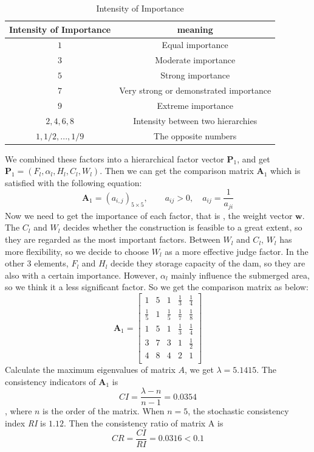 \documentclass{mcmthesis}
\begin{document}
\begin{table}[!ht]
\centering
  \begin{tabular}{cc}
  \hline
   Intensity of Importance & meaning  \\
  \hline
  $1$ & Equal importance \\
  $3$ & Moderate importance \\
  $5$ & Strong importance \\
  $7$ & Very strong or demonstrated importance \\
  $9$ & Extreme importance \\
  $2,4,6,8$ & Intensity between two hierarchies \\
  $1,1/2,...,1/9$ & The opposite numbers\\
  \hline
  \end{tabular}
  \caption{Intensity of Importance}
\end{table}

We combined these factors into a hierarchical factor vector $\textbf{P}_1$, and get $\textbf{P}_1 = (F_{l}, \alpha_{l}, H_{l}, C_{l}, W_{l})$. Then we can get the comparison matrix $\textbf{A}_1$ which is satisfied with the following equation:
\begin{equation}
\textbf{A}_1 = (a_{i,j})_{5\times5},\qquad a_{ij} > 0, \quad a_{ij} = \frac{1}{a_{ji}}
\end{equation}
Now we need to get the importance of each factor, that is , the weight vector $\textbf{w}$. The $C_{l}$ and $W_{l}$ decides whether the construction is feasible to a great extent, so they are regarded as the most important factors. Between $W_{l}$ and $C_{l}$, $W_{l}$ has more flexibility, so we decide to choose $W_{l}$ as a more effective judge factor. In the other 3 elements, $F_{l}$ and $H_{l}$ decide they storage capacity of the dam, so they are also with a certain importance. However, $\alpha_{l}$ mainly influence the submerged area, so we think it a less significant factor. So we get the comparison matrix as below:
\[\textbf{A}_1 = 
\left[
\begin{matrix}
1 & 5 & 1 & \frac{1}{3} & \frac{1}{4} \\
\frac{1}{5}  & 1 & \frac{1}{5} & \frac{1}{7} & \frac{1}{8} \\ 
1 & 5 & 1 & \frac{1}{3} & \frac{1}{4} \\
3 & 7 & 3 & 1 & \frac{1}{2} \\
4 & 8 & 4 & 2 & 1 \\
\end{matrix}
\right]
\]
Calculate the maximum eigenvalues of matrix $A$, we get $\lambda = 5.1415$. The consistency indicators of $\textbf{A}_1$ is \[\mathit{CI} = \frac{\lambda - n}{n - 1} = 0.0354\], where $n$ is the order of the matrix. When $n = 5$, the stochastic consistency index \textit{RI} is $1.12$. Then the consistency ratio of matrix A is \[\mathit{CR} = \frac{\mathit{CI}}{\mathit{RI}} = 0.0316 < 0.1 \]
\end{document}
